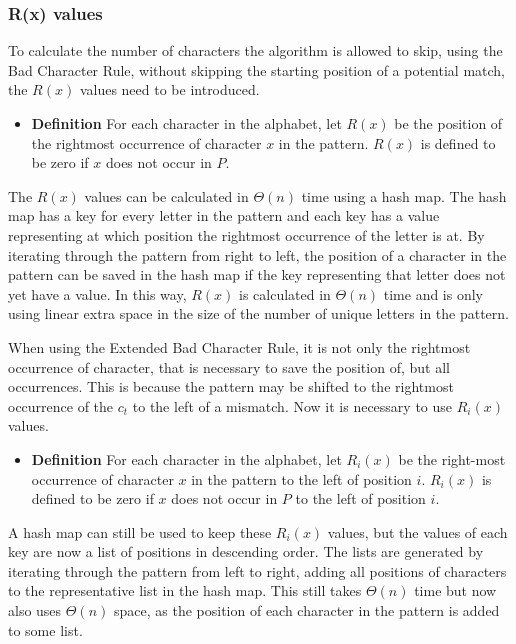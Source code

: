 \subsubsection{R(x) values}
To calculate the number of characters the algorithm is allowed to skip, using the Bad Character Rule, without skipping the starting position of a potential match, the $R(x)$ values need to be introduced. 

\begin{itemize}
    \item[] \textbf{Definition} For each character in the alphabet, let $R(x)$ be the position of the rightmost occurrence of character $x$ in the pattern. $R(x)$ is defined to be zero if $x$ does not occur in $P$.
\end{itemize}

The $R(x)$ values can be calculated in $\Theta(n)$ time using a hash map. The hash map has a key for every letter in the pattern and each key has a value representing at which position the rightmost occurrence of the letter is at. By iterating through the pattern from right to left, the position of a character in the pattern can be saved in the hash map if the key representing that letter does not yet have a value. In this way, $R(x)$ is calculated in $\Theta(n)$ time and is only using linear extra space in the size of the number of unique letters in the pattern.


When using the Extended Bad Character Rule, it is not only the rightmost occurrence of character, that is necessary to save the position of, but all occurrences. This is because the pattern may be shifted to the rightmost occurrence of the $c_t$ to the left of a mismatch. Now it is necessary to use $R_i(x)$ values.

\begin{itemize}
    \item[] \textbf{Definition} For each character in the alphabet, let $R_i(x)$ be the right-most occurrence of character $x$ in the pattern to the left of position $i$. $R_i(x)$ is defined to be zero if $x$ does not occur in $P$ to the left of position $i$.
\end{itemize}

A hash map can still be used to keep these $R_i(x)$ values, but the values of each key are now a list of positions in descending order. The lists are generated by iterating through the pattern from left to right, adding all positions of characters to the representative list in the hash map. This still takes $\Theta(n)$ time but now also uses $\Theta(n)$ space, as the position of each character in the pattern is added to some list.

